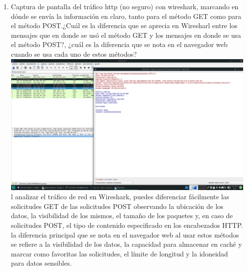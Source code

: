 \documentclass[12pt]{article}
\begin{document}
\begin{enumerate}
    \item Captura de pantalla del tráfico http (no seguro) con wireshark, marcando en dónde se envía la información en claro, tanto para el método GET como para el método POST.¿Cuál es la diferencia que se aprecia en Wiresharl entre los mensajes que en donde se usó el método GET y los mensajes en donde se usa el método POST?, ¿cuál es la diferencia que se nota en el navegador web cuando se usa cada uno de estos métodos?\\
    \textbf{\includegraphics[scale = 0.25]{images/captura de paquetes.png}}\\ l analizar el tráfico de red en Wireshark, puedes diferenciar fácilmente las solicitudes GET de las solicitudes POST observando la ubicación de los datos, la visibilidad de los mismos, el tamaño de los paquetes y, en caso de solicitudes POST, el tipo de contenido especificado en los encabezados HTTP. \\
    la diferencia principal que se nota en el navegador web al usar estos métodos se refiere a la visibilidad de los datos, la capacidad para almacenar en caché y marcar como favoritas las solicitudes, el límite de longitud y la idoneidad para datos sensibles.
\end{enumerate}
\end{document}
